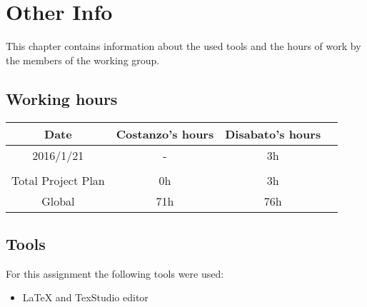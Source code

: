 \documentclass[\mainpath/main]{subfiles}
\begin{document}
\chapter{Other Info}
\label{OtherInfo}

\setmyfancystyle

This chapter contains information about the used tools and the hours of work by the members of the working group.

\section{Working hours}
\begin{table}[h!]
	\centering
\begin{tabular}{cccc}
\hline
Date     	& Costanzo's hours & Disabato's hours  & \\ \hline
2016/1/21 	& -			  	   & 3h 			   & \\ \hline

\\
Total Project Plan  & 0h 		 	   & 3h 			   & \\ \hline
Global 	    & 71h 		 	   & 76h 			   & \\ \hline

\end{tabular}
\end{table}

\section{Tools}
For this assignment the following tools were used:
\begin{itemize}
	\item \LaTeX{} and TexStudio editor
\end{itemize}
\end{document}
